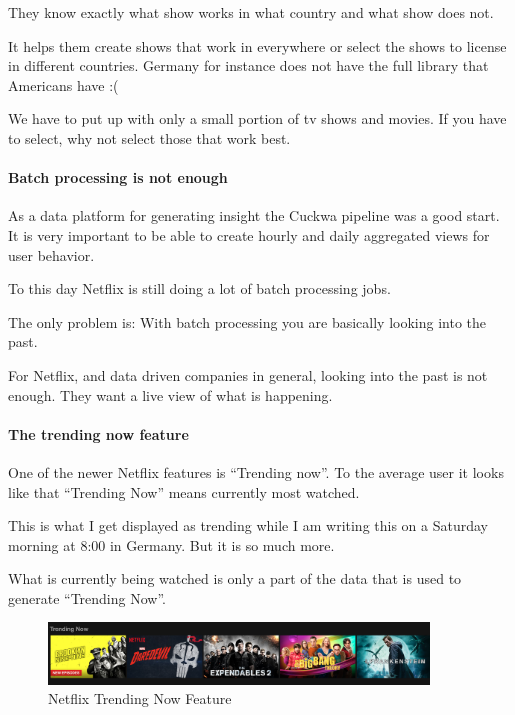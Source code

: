 \documentclass[12pt]{scrartcl} %
\begin{document}
They know exactly what show works in what country and what show does not.

It helps them create shows that work in everywhere or select the shows to license in different countries. Germany for instance does not have the full library that Americans have :(

We have to put up with only a small portion of tv shows and movies. If you have to select, why not select those that work best.

\paragraph{Batch processing is not enough}

As a data platform for generating insight the Cuckwa pipeline was a good start. It is very important to be able to create hourly and daily aggregated views for user behavior.

To this day Netflix is still doing a lot of batch processing jobs.

The only problem is: With batch processing you are basically looking into the past.

For Netflix, and data driven companies in general, looking into the past is not enough. They want a live view of what is happening.

\paragraph{The trending now feature}
One of the newer Netflix features is “Trending now”. To the average user it looks like that “Trending Now” means currently most watched.

This is what I get displayed as trending while I am writing this on a Saturday morning at 8:00 in Germany. But it is so much more.

What is currently being watched is only a part of the data that is used to generate “Trending Now”.

\begin{figure}[htbp] 
  \centering
     \includegraphics[width=0.9\textwidth]{images/Netflix-Trending-Now-Screenshot}
  \caption{Netflix Trending Now Feature}
  \label{fig:Bild1}
\end{figure}
\end{document}
